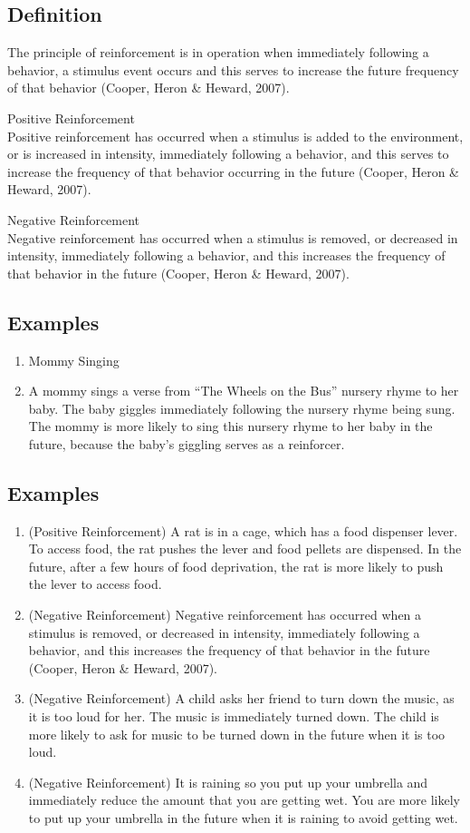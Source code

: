 \subsection{Definition}
The principle of reinforcement is in operation when immediately following a behavior, a stimulus event occurs and this serves to increase the future frequency of that behavior (Cooper, Heron \& Heward, 2007).

Positive Reinforcement\\
Positive reinforcement has occurred when a stimulus is added to the environment, or is increased in intensity, immediately following a behavior, and this serves to increase the frequency of that behavior occurring in the future (Cooper, Heron \& Heward, 2007).

Negative Reinforcement\\
Negative reinforcement has occurred when a stimulus is removed, or decreased in intensity, immediately following a behavior, and this increases the frequency of that behavior in the future (Cooper, Heron \& Heward, 2007).
\subsection{Examples}
\begin{enumerate}
\item Mommy Singing
\item A mommy sings a verse from ``The Wheels on the Bus'' nursery rhyme to her baby. The baby giggles immediately following the nursery rhyme being sung. The mommy is more likely to sing this nursery rhyme to her baby in the future, because the baby's giggling serves as a reinforcer.
\end{enumerate}
 
\subsection{Examples}
\begin{enumerate}
\item (Positive Reinforcement) A rat is in a cage, which has a food dispenser lever. To access food, the rat pushes the lever and food pellets are dispensed. In the future, after a few hours of food deprivation, the rat is more likely to push the lever to access food. 
\item (Negative Reinforcement) Negative reinforcement has occurred when a stimulus is removed, or decreased in intensity, immediately following a behavior, and this increases the frequency of that behavior in the future (Cooper, Heron \& Heward, 2007).
\item (Negative Reinforcement) A child asks her friend to turn down the music, as it is too loud for her. The music is immediately turned down. The child is more likely to ask for music to be turned down in the future when it is too loud.
\item (Negative Reinforcement) It is raining so you put up your umbrella and immediately reduce the amount that you are getting wet. You are more likely to put up your umbrella in the future when it is raining to avoid getting wet. 
\end{enumerate}
%
